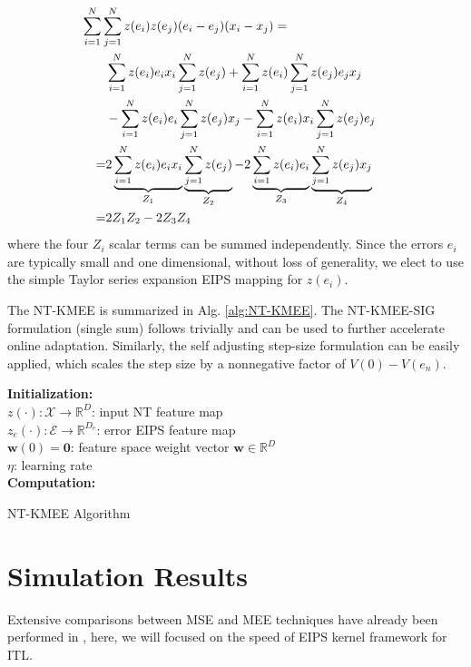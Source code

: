 \documentclass[8pt,twocolumn]{IEEEtran}
\newcommand{\R}{\mathbb{R}}
\newcommand{\X}{\mathcal{X}}
\newcommand{\x}{\mathbf{x}}
\begin{document}
\begin{align}
\lefteqn{\sum^N_{i=1}\sum^N_{j=1}z(e_i)z(e_j)(e_i-e_j)(x_i-x_j)=}\nonumber\\
& & &\sum^N_{i=1}z(e_i)e_i x_i\sum^N_{j=1}z(e_j)+\sum^N_{i=1}z(e_i)\sum^N_{j=1}z(e_j)e_j x_j\nonumber\\
& & &-\sum^N_{i=1}z(e_i)e_i \sum^N_{j=1}z(e_j)x_j-\sum^N_{i=1}z(e_i)x_i\sum^N_{j=1}z(e_j)e_j\nonumber\\
& & =&2 \underbrace{\sum^N_{i=1}z(e_i)e_i x_i}_{Z_1}\underbrace{\sum^N_{j=1}z(e_j)}_{Z_2}-2\underbrace{\sum^N_{i=1}z(e_i)e_i}_{Z_3}\underbrace{\sum^N_{j=1}z(e_j)x_j}_{Z_4}\nonumber\\
& &=&2Z_1 Z_2-2Z_3 Z_4 \qquad\qquad\qquad\qquad\qquad\qquad\qquad\label{eq:DVNT}
\end{align}
where the four $Z_i$ scalar terms can be summed independently.
Since the errors $e_i$ are typically small and one dimensional, without loss of generality, we elect to use the simple Taylor series expansion EIPS mapping for $z(e_i)$.

The NT-KMEE is summarized in Alg. \ref{alg:NT-KMEE}. The NT-KMEE-SIG formulation (single sum) follows trivially and can be used to further accelerate online adaptation. Similarly, the self adjusting step-size formulation \cite{HAN20072733} can be easily applied, which scales the step size by a nonnegative factor of $V(0)-V(e_n)$.

\begin{algorithm}
\textbf{Initialization:}\\
	$z(\cdot):\X\rightarrow\R^D$: input NT feature map\\
	$z_e(\cdot):\mathcal{E}\rightarrow\R^{D_e}$: error EIPS feature map\\
	$\mathbf{w}(0) = \textbf{0}$: feature space weight vector $\mathbf{w}\in\R^D$\\
	$\eta$: learning rate\\
	\textbf{Computation:}\\
	\For{n = 1, 2, $\cdots$}{
		$e_n = y_{n} -\textbf{w}^\intercal_{n-1}z(\x_{n})$\\
		$\mathbf{w}_{n} = \mathbf{w}_{n-1}+\,\eta \nabla \hat{V}_2(e_{n})$ \eqref{eq:DVNT}
	}
	\normalsize
	\caption{NT-KMEE Algorithm}
	\label{alg:NT-KMEE}	
\end{algorithm}
\section{Simulation Results}\label{Sec:Simulation}
Extensive comparisons between MSE and MEE techniques have already been performed in \cite{Erdogmus2002,KMCC,KMEE}, here, we will focused on the speed of EIPS kernel framework for ITL.
\end{document}
